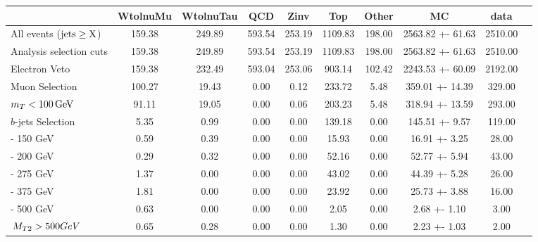 \begin{table}[!htb]
\setlength{\tabcolsep}{2pt}
\small
\begin{center} 

\begin{tabular}{lccccccccc} 
\hline\hline
& WtolnuMu& WtolnuTau& QCD& Zinv& Top& Other& MC& data \\ \hline \hline
 All events ($\rm jets\geq X$) & 159.38  & 249.89  & 593.54  & 253.19  & 1109.83    & 198.00  & 2563.82 +- 61.63 & 2510.00  \\ 
Analysis selection cuts& 159.38  & 249.89  & 593.54  & 253.19  & 1109.83   & 198.00  & 2563.82 +- 61.63 & 2510.00  \\
 Electron Veto & 159.38  & 232.49  & 593.04  & 253.06  & 903.14    & 102.42  & 2243.53 +- 60.09 & 2192.00  \\
 Muon Selection & 100.27  & 19.43  & 0.00  & 0.12  & 233.72   & 5.48  & 359.01 +- 14.39 & 329.00  \\
 $m_T < 100\, \rm GeV$ & 91.11  & 19.05  & 0.00  & 0.06  & 203.23   & 5.48  & 318.94 +- 13.59 & 293.00  \\
 $b$-jets Selection & 5.35  & 0.99  & 0.00  & 0.00  & 139.18    & 0.00  & 145.51 +- 9.57 & 119.00  \\
 \mttwo  125 - 150 GeV & 0.59  & 0.39  & 0.00  & 0.00  & 15.93  & 0.00  & 16.91 +- 3.25 & 28.00  \\
 \mttwo  150 - 200 GeV & 0.29  & 0.32  & 0.00  & 0.00  & 52.16  & 0.00  & 52.77 +- 5.94 & 43.00  \\
 \mttwo  200 - 275 GeV & 1.37  & 0.00  & 0.00  & 0.00  & 43.02  & 0.00  & 44.39 +- 5.28 & 26.00  \\
 \mttwo  275 - 375 GeV & 1.81  & 0.00  & 0.00  & 0.00  & 23.92  & 0.00  & 25.73 +- 3.88 & 16.00  \\
 \mttwo  375 - 500 GeV & 0.63  & 0.00  & 0.00  & 0.00  & 2.05   & 0.00  & 2.68 +- 1.10 & 3.00  \\
 $\,{M_{T2}} > 500 GeV$ & 0.65  & 0.28  & 0.00  & 0.00  & 1.30   & 0.00  & 2.23 +- 1.03 & 2.00  \\



\end{tabular}
\end{center}
\end{table}
